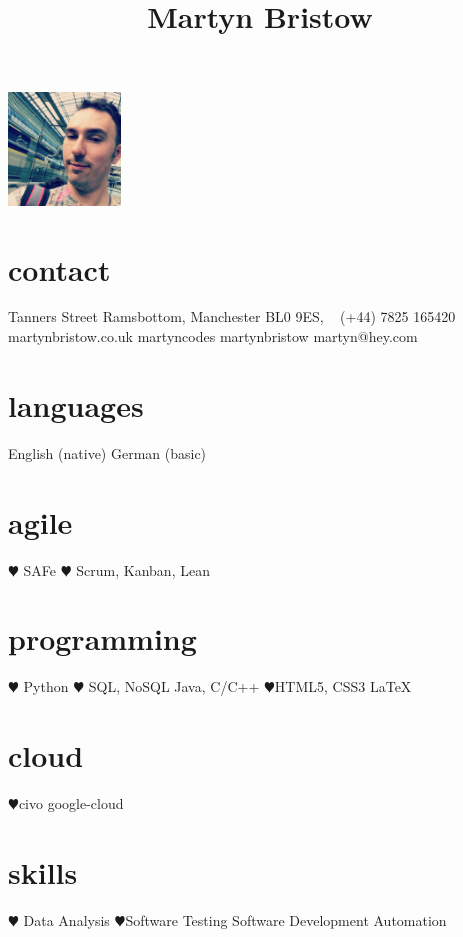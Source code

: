 \documentclass[]{cv-style}          %
\begin{document}
\lastupdated
\title{Martyn Bristow}


\begin{aside}
%
\includegraphics[width=3cm]{martyn-eurostar.jpg}
\section{contact}
 Tanners Street
\hspace*{25pt} Ramsbottom, Manchester
\hspace*{25pt} BL0 9ES,
~
\faPhone (+44) 7825 165420
~
{\faGlobe martynbristow.co.uk}
{\faTwitter martyncodes}
{\faGithub martynbristow}
{\faEnvelope martyn@hey.com}
\section{languages}
English (native)
German (basic)
%
\section{agile}
{\color{red} $\varheartsuit$} SAFe {\color{red} $\varheartsuit$} Scrum, Kanban, Lean
\section{programming}
{\color{red} $\varheartsuit$} Python
{\color{red} $\varheartsuit$} SQL, NoSQL
Java, C/C++
{\color{red} $\varheartsuit$}HTML5, CSS3 \LaTeX{}
\section{cloud}
{\color{red} $\varheartsuit$}civo google-cloud
\section{skills}
{\color{red} $\varheartsuit$} Data Analysis
{\color{red} $\varheartsuit$}Software Testing
Software Development
Automation

\end{aside}
\end{document}
